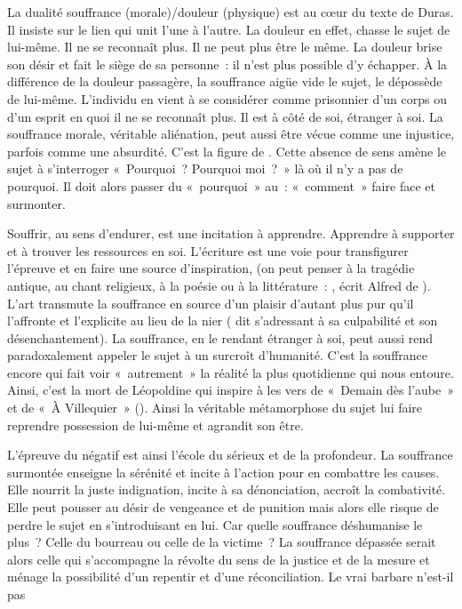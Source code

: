 {La dualité souffrance (morale)/douleur (physique) est au cœur du texte de Duras. Il insiste
sur le lien qui unit l'une à l'autre. La douleur en effet, chasse le sujet de lui-même. Il ne se
reconnaît plus. Il ne peut plus être le même. La douleur brise son désir et fait le siège de sa
personne~: il n'est plus possible d'y échapper. À la différence de la douleur passagère, la
souffrance aigüe vide le sujet, le dépossède de lui-même. L'individu en vient à se considérer
comme prisonnier d'un corps ou d'un esprit en quoi il ne se reconnaît plus. Il est à côté de soi,
étranger à soi. La souffrance morale, véritable aliénation, peut aussi être vécue comme une
injustice, parfois comme une absurdité. C'est la figure de . Cette absence de sens amène le
sujet à s'interroger «~Pourquoi~? Pourquoi moi~?~» là où il n'y a pas de pourquoi. Il doit alors
passer du «~pourquoi~» au~: «~comment~» faire face et surmonter.

Souffrir, au sens d'endurer, est une incitation à apprendre. Apprendre à supporter et à
trouver les ressources en soi. L'écriture est une voie pour transfigurer l'épreuve et en faire une
source d'inspiration, (on peut penser à la tragédie antique, au chant religieux, à la poésie ou à la
littérature~: , écrit Alfred de ). L'art transmute la souffrance en source d'un plaisir
d'autant plus pur qu'il l'affronte et l'explicite au lieu de la nier ( dit  s'adressant à sa culpabilité et son désenchantement). La souffrance,
en le rendant étranger à soi, peut aussi rend paradoxalement appeler le sujet à un surcroît
d'humanité. C'est la souffrance encore qui fait voir «~autrement~» la réalité la plus quotidienne qui
nous entoure. Ainsi, c'est la mort de Léopoldine qui inspire à  les vers de «~Demain dès
l'aube~» et de «~À Villequier~» (). Ainsi la véritable métamorphose du sujet lui
faire reprendre possession de lui-même et agrandit son être.

L'épreuve du négatif est ainsi l'école du sérieux et de la profondeur. La souffrance
surmontée enseigne la sérénité et incite à l'action pour en combattre les causes. Elle nourrit la
juste indignation, incite à sa dénonciation, accroît la combativité. Elle peut pousser au désir de
vengeance et de punition mais alors elle risque de perdre le sujet en s'introduisant en lui. Car
quelle souffrance déshumanise le plus~? Celle du bourreau ou celle de la victime~? La souffrance
dépassée serait alors celle qui s'accompagne la révolte du sens de la justice et de la mesure et
ménage la possibilité d'un repentir et d'une réconciliation. Le vrai barbare n'est-il pas }

